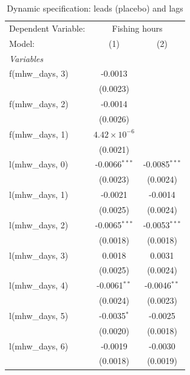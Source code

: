 
\begin{table}[htbp]
   \caption{\label{tab:dyn} Dynamic specification: leads (placebo) and lags}
   \centering
   \begin{tabular}{lcc}
      \tabularnewline \midrule \midrule
      Dependent Variable: & \multicolumn{2}{c}{Fishing hours}\\
      Model:               & (1)                   & (2)\\  
      \midrule
      \emph{Variables}\\
      f(mhw\_days, 3)      & -0.0013               &   \\   
                           & (0.0023)              &   \\   
      f(mhw\_days, 2)      & -0.0014               &   \\   
                           & (0.0026)              &   \\   
      f(mhw\_days, 1)      & $4.42\times 10^{-6}$  &   \\   
                           & (0.0021)              &   \\   
      l(mhw\_days, 0)      & -0.0066$^{***}$       & -0.0085$^{***}$\\   
                           & (0.0023)              & (0.0024)\\   
      l(mhw\_days, 1)      & -0.0021               & -0.0014\\   
                           & (0.0025)              & (0.0024)\\   
      l(mhw\_days, 2)      & -0.0065$^{***}$       & -0.0053$^{***}$\\   
                           & (0.0018)              & (0.0018)\\   
      l(mhw\_days, 3)      & 0.0018                & 0.0031\\   
                           & (0.0025)              & (0.0024)\\   
      l(mhw\_days, 4)      & -0.0061$^{**}$        & -0.0046$^{**}$\\   
                           & (0.0024)              & (0.0023)\\   
      l(mhw\_days, 5)      & -0.0035$^{*}$         & -0.0025\\   
                           & (0.0020)              & (0.0018)\\   
      l(mhw\_days, 6)      & -0.0019               & -0.0030\\   
                           & (0.0018)              & (0.0019)\\   

\end{tabular}
\end{table}
